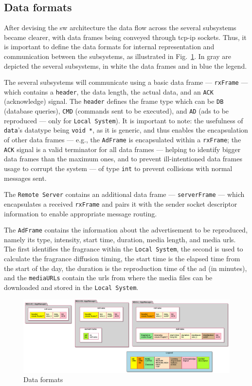 \subsection{Data formats}
\label{sec:data-formats}
After devising the \gls{sw} architecture the data flow across the several
subsystems became clearer, with data frames being conveyed through \gls{tcp-ip}
sockets. Thus, it is important to define the data formats for internal
representation and communication between the subsystems, as illustrated in
Fig.~\ref{fig:data-formats}. In gray are depicted the several subsystems, in
white the data frames and in blue the legend.

The several subsystems will communicate using a basic data frame ---
\texttt{rxFrame} --- which contains a \texttt{header}, the data length, the
actual data, and an \texttt{ACK} (acknowledge) signal. The \texttt{header} defines the frame type which can be \texttt{DB}
(database queries), \texttt{CMD} (commands sent to be executed), and \texttt{AD}
(ads to be reproduced --- only for \texttt{Local System}). It is important to
note: the usefulness of \texttt{data}'s datatype being \texttt{void *}, as it is
generic, and thus enables the encapsulation of other data frames --- e.g., the
\texttt{AdFrame} is encapsulated within a \texttt{rxFrame}; the \texttt{ACK}
signal is a valid terminator for all data frames --- helping to identify bigger
data frames than the maximum ones, and to prevent ill-intentioned data frames
usage to corrupt the system --- of type \texttt{int} to prevent collisions with
normal messages sent.

The \texttt{Remote Server} contains an additional data frame ---
\texttt{serverFrame} --- which encapsulates a received \texttt{rxFrame} and
pairs it with the sender socket descriptor information to enable appropriate
message routing.

The \texttt{AdFrame} contains the information about the advertisement to be
reproduced, namely its type, intensity, start time, duration, media length, and media \glspl{url}. The
first identifies the fragrance within the \texttt{Local System}, the second is
used to calculate the fragrance diffusion timing, the start time is the elapsed
time from the start of the day, the duration is the reproduction time of the ad
(in minutes), and the \texttt{mediaURLs} contain the \glspl{url} from where the
media files can be downloaded and stored in the \texttt{Local System}.
%
\begin{figure}[htb!]
\centering
    \includegraphics[width=1.0\columnwidth]{./img/data-formats.png}
  \caption{Data formats}%
\label{fig:data-formats}
\end{figure}
%


